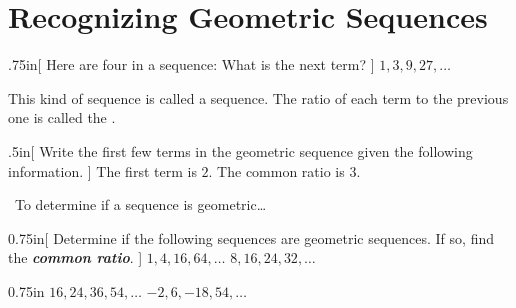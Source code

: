 \section{Recognizing Geometric Sequences}

\begin{myWideProblem}{.75in}[%
    Here are four  in a sequence:
    What is the next term?
    ]
    {
        \(
            1, 3, 9, 27, \dots
        \)
    }
\end{myWideProblem}

This kind of sequence is called a  sequence.
The ratio of each term to the previous one is called the .


\begin{myWideProblem}{.5in}[
        Write the first few terms in the geometric sequence given the following information.
    ]
    {
        The first term is $2$. The common ratio is $3$.
    }
    \end{myWideProblem}
    
\begin{myConceptSteps}{~To determine if a sequence is geometric\dots}
\end{myConceptSteps}

%

\begin{my2Problems}{0.75in}[%
        Determine if the following sequences are geometric sequences.
        If so, find the {\bfseries\itshape common ratio}.
    ]
    {
        $1, 4, 16, 64, \dots$
    }
    {
        $8, 16, 24, 32, \dots$
    }
\end{my2Problems}
\begin{my2Problems}{0.75in}
    {
        $16, 24, 36, 54, \dots$
    }
    {
        $-2, 6, -18, 54, \dots$
    }
\end{my2Problems}
